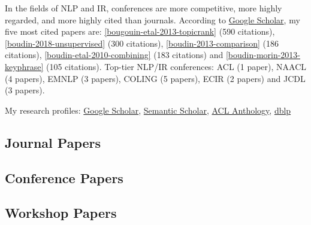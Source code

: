 In the fields of NLP and IR, conferences are more competitive, more highly regarded, and more highly cited than journals.
%
According to \href{https://scholar.google.com/citations?user=Vk68rbkAAAAJ}{Google Scholar}, my five most cited papers are: 
\ref{bougouin-etal-2013-topicrank} {\small (590 citations)}, 
\ref{boudin-2018-unsupervised} {\small (300 citations)}, 
\ref{boudin-2013-comparison} {\small (186 citations)},
\ref{boudin-etal-2010-combining} {\small (183 citations)} and 
\ref{boudin-morin-2013-keyphrase} {\small (105 citations)}.
%
Top-tier NLP/IR conferences: 
ACL {\small (1 paper)}, 
NAACL {\small (4 papers)}, 
EMNLP {\small (3 papers)}, 
COLING {\small (5 papers)}, 
ECIR {\small (2 papers)} and 
JCDL {\small (3 papers)}.

\vspace{1em}

My research profiles: 
\href{https://scholar.google.com/citations?user=Vk68rbkAAAAJ}{Google Scholar}, 
\href{https://www.semanticscholar.org/author/Florian-Boudin/2346578}{Semantic Scholar},
\href{https://aclanthology.org/people/f/florian-boudin/}{ACL Anthology},
\href{https://dblp.org/pid/54/2762.html}{dblp}


\subsection{Journal Papers}

\begin{enumerate}[label=(J{\scriptsize\arabic*}),font=\small\bfseries\color{VioletRed},itemsep=0cm]
    
\end{enumerate}

\subsection{Conference Papers}

\begin{enumerate}[label=(C{\scriptsize\arabic*}),font=\small\bfseries\color{VioletRed},itemsep=0cm]
    
\end{enumerate}

\subsection{Workshop Papers}

\begin{enumerate}[label=(W{\scriptsize\arabic*}),font=\small\bfseries\color{VioletRed},itemsep=0cm]
    
\end{enumerate}


